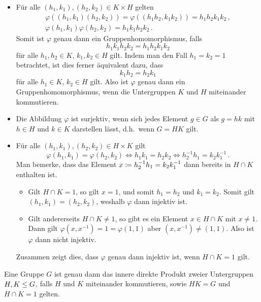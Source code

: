 \begin{itemize}
  \item
    Für alle $(h_1, k_1), (h_2, k_2) \in K \times H$ gelten
    \begin{gather*}
        \varphi((h_1, k_1) (h_2, k_2))
      = \varphi((h_1 h_2, k_1 k_2))
      = h_1 h_2 k_1 k_2 \,,
      \\
        \varphi(h_1, k_1) \varphi(h_2, k_2)
      = h_1 k_1 h_2 k_2 \,.
    \end{gather*}
    Somit ist $\varphi$ genau dann ein Gruppenhomomorphismus, falls
    \[
        h_1 k_1 h_2 k_2
      = h_1 h_2 k_1 k_2
    \]
    für alle $h_1, h_2 \in K$, $k_1, k_2 \in H$ gilt.
    Indem man den Fall $h_1 = k_2 = 1$ betrachtet, ist dies ferner äquivalent dazu, dass
    \[
        k_1 h_2
      = h_2 k_1
    \]
    für alle $h_1 \in K$, $k_2 \in H$ gilt.
    Also ist $\varphi$ genau dann ein Gruppenhomomorphismus, wenn die Untergruppen $K$ und $H$ miteinander kommutieren.
    
  \item
    Die Abbildung $\varphi$ ist surjektiv, wenn sich jedes Element $g \in G$ als $g = hk$ mit $h \in H$ und $k \in K$ darstellen lässt, d.h.\ wenn $G = HK$ gilt.
    
  \item
    Für alle $(h_1, k_1), (h_2, k_2) \in H \times K$ gilt
    \[
            \varphi(h_1, k_1) = \varphi(h_2, k_2)
      \iff  h_1 k_1 = h_2 k_2
      \iff  h_2^{-1} h_1 = k_2 k_1^{-1} \,.
    \]
    Man bemerke, dass das Element $x \coloneqq h_2^{-1} h_1 = k_2 k_1^{-1}$ dann bereits in $H \cap K$ enthalten ist.
    
    \begin{itemize}
      \item
        Gilt $H \cap K = 1$, so gilt $x = 1$, und somit $h_1 = h_2$ und $k_1 = k_2$.
        Somit gilt $(h_1, k_1) = (h_2, k_2)$, weshalb $\varphi$ dann injektiv ist.
      \item
        Gilt andererseits $H \cap K \neq 1$, so gibt es ein Element $x \in H \cap K$ mit $x \neq 1$.
        Dann gilt $\varphi(x, x^{-1}) = 1 = \varphi(1,1)$ aber $(x, x^{-1}) \neq (1,1)$.
        Also ist $\varphi$ dann nicht injektiv.
    \end{itemize}
    
    Zusammen zeigt dies, dass $\varphi$ genau dann injektiv ist, wenn $H \cap K = 1$ gilt.
\end{itemize}


\begin{proposition}
  \label{proposition: first characterization}
  Eine Gruppe $G$ ist genau dann das innere direkte Produkt zweier Untergruppen $H, K \leq G$, falls $H$ und $K$ miteinander kommutieren, sowie $HK = G$ und $H \cap K = 1$ gelten.
\end{proposition}





